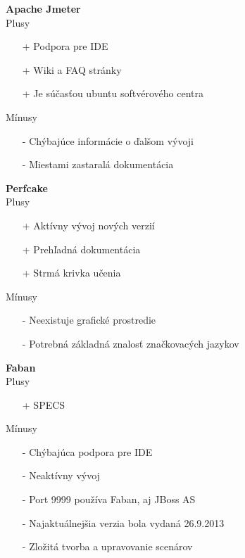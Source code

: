 \documentclass[12pt,oneside,final]{fithesis-utf8}
\begin{document}
\textbf{Apache Jmeter}
\newline \\
Plusy
\begin{itemize}
\item[+] Podpora pre IDE
\item[+] Wiki a FAQ stránky
\item[+] Je súčasťou ubuntu softvérového centra \\
\end{itemize}

\noindent Mínusy
\begin{itemize}
\item[-] Chýbajúce informácie o ďalšom vývoji
\item[-] Miestami zastaralá dokumentácia \\
\end{itemize}

\noindent \textbf{Perfcake}
\newline \\
Plusy
\begin{itemize}
\item[+] Aktívny vývoj nových verzií
\item[+] Prehľadná dokumentácia
\item[+] Strmá krivka učenia \\
\end{itemize}

\newpage

\noindent Mínusy
\begin{itemize}
\item[-] Neexistuje grafické prostredie
\item[-] Potrebná základná znalosť značkovacých jazykov \\
\end{itemize}

\noindent \textbf{Faban}
\newline \\
Plusy
\begin{itemize}
\item[+] SPECS
\end{itemize}

\noindent Mínusy
\begin{itemize}
\item[-] Chýbajúca podpora pre IDE
\item[-] Neaktívny vývoj
\item[-] Port 9999 používa Faban, aj JBoss AS
\item[-] Najaktuálnejšia verzia bola vydaná 26.9.2013 
\item[-] Zložitá tvorba a upravovanie scenárov \\
\end{itemize}
\end{document}
